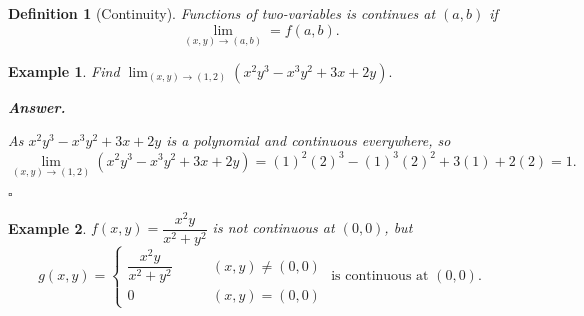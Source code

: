 \documentclass[12pt,a4paper]{article}
\newtheorem{df}{Definition}[subsection]
\newtheorem{eg}{Example}[subsection]
\newenvironment*{ans}{\par\indent\textbf{\textit{Answer. }}\par}{\par\hfill{$\square$}\par}
\begin{document}
\begin{df}[Continuity]
	Functions of two-variables is continues at $(a,b)$ if \[\lim_{(x,y)\to(a,b)}=f(a,b).\]
\end{df}
\begin{eg}
	Find $\displaystyle\lim_{(x,y)\to(1,2)}(x^2y^3-x^3y^2+3x+2y).$
	\begin{ans}
		As $x^2y^3-x^3y^2+3x+2y$ is a polynomial and continuous everywhere, so 
		\[\lim_{(x,y)\to(1,2)}(x^2y^3-x^3y^2+3x+2y)=(1)^2(2)^3-(1)^3(2)^2
		+3(1)+2(2)=1.\]
	\end{ans}
\end{eg}
\begin{eg}
	$f(x,y)=\dfrac{x^2y}{x^2+y^2}$ is not continuous at $(0,0)$, but \[g(x,y)=\begin{cases}\dfrac{x^2y}{x^2+y^2}\qquad &(x,y)\neq(0,0)\\0\qquad &(x,y)=(0,0)\end{cases}\text{ is continuous at }(0,0).\]
\end{eg}
\end{document}
